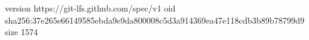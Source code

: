 version https://git-lfs.github.com/spec/v1
oid sha256:37e265e66149585ebda9e9da800008c5d3a914369ea47e118cdb3b89b78799d9
size 1574
